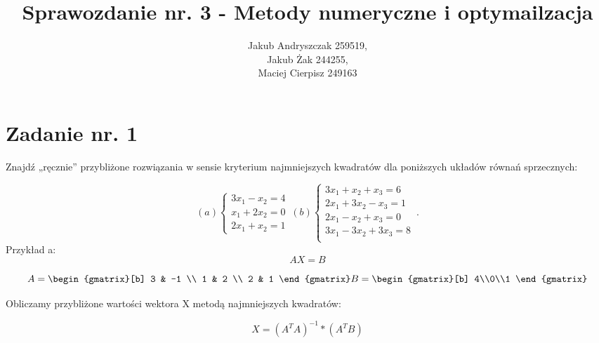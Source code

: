 \documentclass{article}
\begin{document}
\title{Sprawozdanie nr. 3 - Metody numeryczne i optymailzacja}
\author{Jakub Andryszczak 259519,\\ Jakub Żak 244255,\\ Maciej Cierpisz 249163}
\date{}
\maketitle

\newpage
\tableofcontents

\newpage
\section{Zadanie nr. 1}
Znajdź „ręcznie” przybliżone rozwiązania w sensie kryterium najmniejszych kwadratów dla poniższych układów równań sprzecznych:

\begin{equation}
  (a)
  \begin{cases}
    3x_1-x_2=4 \\
    x_1+2x_2=0 \\
    2x_1+x_2=1
  \end{cases}\,
  (b)
  \begin{cases}
    3x_1+x_2+x_3=6 \\
    2x_1+3x_2 -x_3=1 \\
    2x_1-x_2+x_3=0\\
    3x_1-3x_2+3x_3=8\\
  \end{cases}\,.
\end{equation}
Przykład a:
\begin{equation}
  AX=B
\end{equation}


\begin{equation}
  A=
  \begin{gmatrix}[b]
   3 & -1 \\
   1 & 2 \\
   2 & 1 
  \end{gmatrix}
  B=
  \begin{gmatrix}[b]
    4\\0\\1
  \end{gmatrix}
\end{equation}

Obliczamy przybliżone wartości wektora X metodą najmniejszych kwadratów:

\begin{equation}
  X=(A^{T}A)^{-1} *(A^{T}B)
\end{equation}
\end{document}
